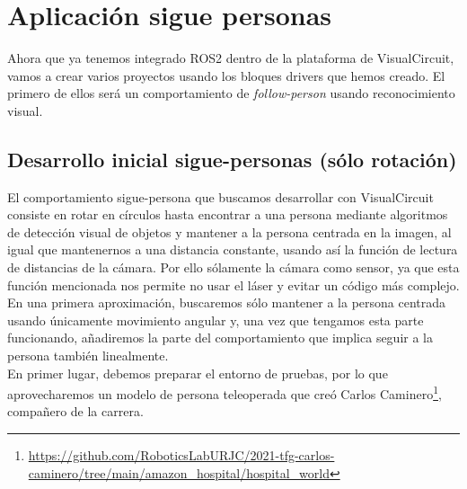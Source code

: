 \chapter{Aplicación sigue personas}
\label{cap:capitulo5}
Ahora que ya tenemos integrado ROS2 dentro de la plataforma de VisualCircuit, vamos a crear varios proyectos usando los bloques drivers que hemos creado.
El primero de ellos será un comportamiento de \textit{follow-person} usando reconocimiento visual.

\section{Desarrollo inicial sigue-personas (sólo rotación)}
\label{sec:FP_intro}

El comportamiento sigue-persona que buscamos desarrollar con VisualCircuit consiste en rotar en círculos hasta encontrar a una persona mediante
algoritmos de detección visual de objetos y mantener a la persona centrada en la imagen, al igual que mantenernos a una distancia constante,
usando así la función de lectura de distancias de la cámara. Por ello sólamente la cámara como sensor, ya que esta función mencionada nos permite no
usar el láser y evitar un código más complejo.\\

En una primera aproximación, buscaremos sólo mantener a la persona centrada usando únicamente movimiento angular y, una vez que tengamos esta parte funcionando,
añadiremos la parte del comportamiento que implica seguir a la persona también linealmente.\\

En primer lugar, debemos preparar el entorno de pruebas, por lo que aprovecharemos un modelo de persona teleoperada que creó Carlos
Caminero\footnote{\url{https://github.com/RoboticsLabURJC/2021-tfg-carlos-caminero/tree/main/amazon_hospital/hospital_world}}, compañero de la carrera.

